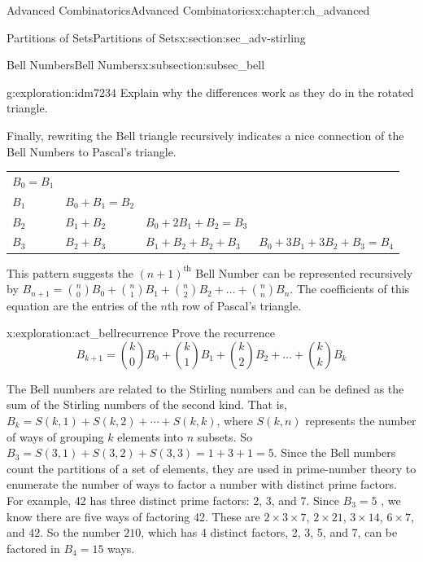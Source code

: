 \documentclass[oneside,10pt,]{book}
\numberwithin{equation}{chapter}
\begin{document}
\begin{chapterptx}{Advanced Combinatorics}{}{Advanced Combinatorics}{}{}{x:chapter:ch_advanced}
\begin{sectionptx}{Partitions of Sets}{}{Partitions of Sets}{}{}{x:section:sec_adv-stirling}
\begin{subsectionptx}{Bell Numbers}{}{Bell Numbers}{}{}{x:subsection:subsec_bell}
\begin{sidebyside}{1}{0}{0}{0}
\begin{sbspanel}{1}
{\par}
\end{sbspanel}%
\end{sidebyside}%
\begin{exploration}{}{g:exploration:idm7234}%
Explain why the differences work as they do in the rotated triangle.%
\end{exploration}
Finally, rewriting the Bell triangle recursively indicates a nice connection of the Bell Numbers to Pascal's triangle.%
\begin{sidebyside}{1}{0}{0}{0}%
\begin{sbspanel}{1}%
{\centering%
\begin{tabular}{llll}
\(B_{0} = B_{1}\)&&&\tabularnewline[0pt]
\(B_{1}\)&\(B_{0} + B_{1} = B_{2}\)&&\tabularnewline[0pt]
\(B_{2}\)&\(B_{1} + B_{2}\)&\(B_{0} + 2B_{1} + B_{2} = B_{3}\)&\tabularnewline[0pt]
\(B_{3}\)&\(B_{2} + B_{3}\)&\(B_{1} + B_{2} + B_{2} + B_{3}\)&\(B_{0} + 3B_{1} + 3B_{2} + B_{3} = B_{4}\)
\end{tabular}
\par}
\end{sbspanel}%
\end{sidebyside}%
\par
This pattern suggests the \({(n + 1)}^{\text{th}}\) Bell Number can be represented recursively by \(B_{n + 1} = \binom{n}{0} B_{0} + \binom{n}{1} B_{1} + \binom{n}{2}B_{2} + \ldots + \binom{n}{n} B_{n}\). The coefficients of this equation are the entries of the \(n\)th row of Pascal's triangle.%
\begin{exploration}{}{x:exploration:act_bellrecurrence}%
Prove the recurrence%
\begin{equation*}
B_{k + 1} = \binom{k}{0} B_{0} + \binom{k}{1} B_{1} + \binom{k}{2}B_{2} + \ldots + \binom{k}{k} B_{k}
\end{equation*}
%
\end{exploration}
The Bell numbers are related to the Stirling numbers and can be defined as the sum of the Stirling numbers of the second kind. That is, \(B_{k} = S(k,1) + S(k,2) + \cdots + S(k,k)\), where \(S(k,n)\) represents the number of ways of grouping \(k\) elements into \(n\) subsets. So \(B_{3} = S(3,1) + S(3,2) + S(3,3) = 1 + 3 + 1 = 5\). Since the Bell numbers count the partitions of a set of elements, they are used in prime-number theory to enumerate the number of ways to factor a number with distinct prime factors. For example, 42 has three distinct prime factors: 2, 3, and 7. Since \(B_{3} = 5\) , we know there are five ways of factoring 42. These are \(2 \times 3 \times 7\), \(2 \times 21\), \(3 \times 14\), \(6 \times 7\), and \(42\). So the number \(210\), which has 4 distinct factors, 2, 3, 5, and 7, can be factored in \(B_{4} = 15\) ways.%

\end{subsectionptx}
\end{sectionptx}
\end{chapterptx}
\end{document}
